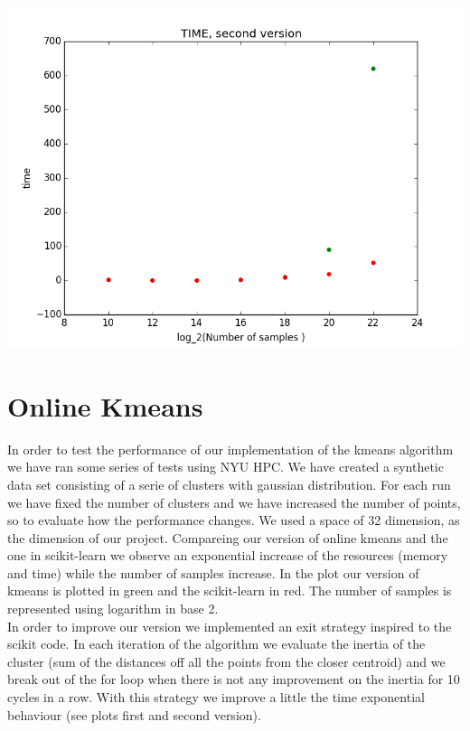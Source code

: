 \documentclass[12pt]{article}
\begin{document}
\begin{table}
\includegraphics[scale=0.4]{time_secondVersion.png}
  \end{table}

\section{Online Kmeans}
In order to test the performance of our implementation of the kmeans algorithm we have ran some series of tests using NYU HPC. We have created a synthetic data set consisting of a serie of clusters with gaussian distribution. For each run we have fixed the number of clusters and we have increased the number of points, so to evaluate how the performance changes.  We used a space of 32 dimension, as the dimension of our project. 
Compareing our version of online kmeans and the one in scikit-learn we observe an exponential increase of the resources (memory and time) while the number of samples increase. In the plot our version of kmeans is plotted in green and the scikit-learn in red. The number of samples is represented using logarithm in base 2.\\
In order to improve our version we implemented an exit strategy inspired to the scikit code. In each iteration of the algorithm we evaluate the inertia of the cluster (sum of the distances off all the points from the closer centroid) and we break out of the for loop when there is not any improvement on the inertia for 10 cycles in a row. With this strategy we improve a little the time exponential behaviour (see plots first and second version).


  
  
  \newpage
  
\end{document}
